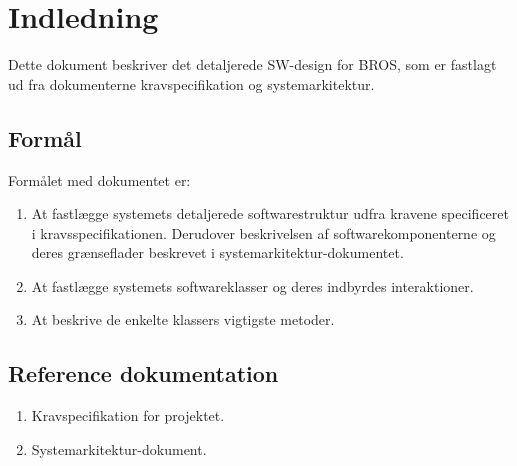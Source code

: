 \chapter{Indledning}
Dette dokument beskriver det detaljerede SW-design for BROS, som er fastlagt ud fra dokumenterne kravspecifikation og systemarkitektur.
\section{Formål}
Formålet med dokumentet er:\\
\begin{enumerate}[$\bullet$]
\item At fastlægge systemets detaljerede softwarestruktur udfra kravene specificeret i kravsspecifikationen. Derudover beskrivelsen af softwarekomponenterne og deres grænseflader beskrevet i systemarkitektur-dokumentet.
\item At fastlægge systemets softwareklasser og deres indbyrdes interaktioner.
\item At beskrive de enkelte klassers vigtigste metoder.
\end{enumerate}
\section{Reference dokumentation}
\begin{enumerate}[$\bullet$]
\item Kravspecifikation for projektet.
\item Systemarkitektur-dokument.
\end{enumerate}
